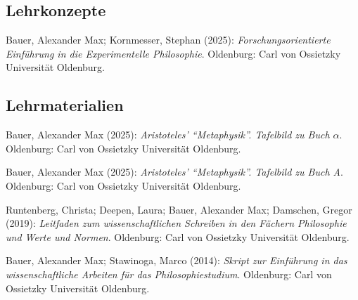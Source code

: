 \documentclass[a4paper,10pt]{article}
\newenvironment{literature}{%
   \parskip6pt\parindent0pt\raggedright
   \def\lititem{\hangindent=1cm\hangafter1}}{%
   \par\ignorespaces}
\begin{document}
\subsection*{Lehrkonzepte}
\begin{literature}
\lititem Bauer, Alexander Max; Kornmesser, Stephan (2025): \textit{Forschungsorientierte Einführung in die Experimentelle Philosophie}. Oldenburg: Carl von Ossietzky Universität Oldenburg.
\end{literature}


\subsection*{Lehrmaterialien}
\begin{literature}
\lititem Bauer, Alexander Max (2025): \textit{Aristoteles' \enquote{Metaphysik}. Tafelbild zu Buch $\alpha$}. Oldenburg: Carl von Ossietzky Universität Oldenburg.

\lititem Bauer, Alexander Max (2025): \textit{Aristoteles' \enquote{Metaphysik}. Tafelbild zu Buch A}. Oldenburg: Carl von Ossietzky Universität Oldenburg.

\lititem Runtenberg, Christa; Deepen, Laura; Bauer, Alexander Max; Damschen, Gregor (2019): \textit{Leitfaden zum wissenschaftlichen Schreiben in den Fächern Philosophie und Werte und Normen}. Oldenburg: Carl von Ossietzky Universität Oldenburg.

\lititem Bauer, Alexander Max; Stawinoga, Marco (2014): \textit{Skript zur Einführung in das wissenschaftliche Arbeiten für das Philosophiestudium}. Oldenburg: Carl von Ossietzky Universität Oldenburg.
\end{literature}


\end{document}
